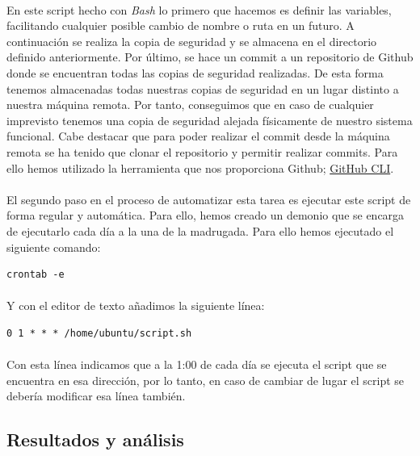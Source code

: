 \paragraph{}
En este script hecho con \textit{Bash} lo primero que hacemos es definir las variables, facilitando cualquier posible cambio de nombre o ruta en un futuro. A continuación se realiza la copia de seguridad y se almacena en el directorio definido anteriormente. Por último, se hace un commit a un repositorio de Github donde se encuentran todas las copias de seguridad realizadas. De esta forma tenemos almacenadas todas nuestras copias de seguridad en un lugar distinto a nuestra máquina remota. Por tanto, conseguimos que en caso de cualquier imprevisto tenemos una copia de seguridad alejada físicamente de nuestro sistema funcional. Cabe destacar que para poder realizar el commit desde la máquina remota se ha tenido que clonar el repositorio y permitir realizar commits. Para ello hemos utilizado la herramienta que nos proporciona Github; \href{https://docs.github.com/es/github-cli/github-cli/quickstart}{GitHub CLI}. 
\paragraph{}
El segundo paso en el proceso de automatizar esta tarea es ejecutar este script de forma regular y automática. Para ello, hemos creado un demonio que se encarga de ejecutarlo cada día a la una de la madrugada. Para ello hemos ejecutado el siguiente comando:
\begin{lstlisting}[frame=single, basicstyle=\tiny]
crontab -e
\end{lstlisting}
\paragraph{}
Y con el editor de texto añadimos la siguiente línea:
\begin{lstlisting}[frame=single, basicstyle=\tiny]
0 1 * * * /home/ubuntu/script.sh
\end{lstlisting}
\paragraph{}
Con esta línea indicamos que a la 1:00 de cada día se ejecuta el script que se encuentra en esa dirección, por lo tanto, en caso de cambiar de lugar el script se debería modificar esa línea también.

\subsection{Resultados y análisis}
